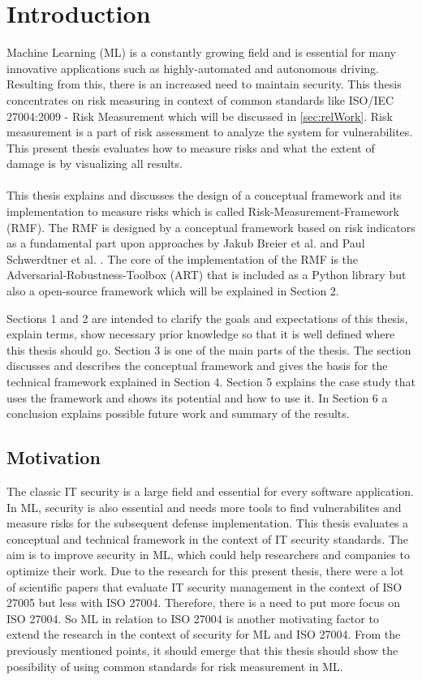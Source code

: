 \section{Introduction}
\label{sec:intro}

Machine Learning (ML) is a constantly growing field and is essential for many innovative applications such as highly-automated and autonomous driving. Resulting from this,
there is an increased need to maintain security. This thesis concentrates on risk measuring in context of common standards like ISO/IEC 27004:2009 - Risk Measurement which will be
discussed in \ref{sec:relWork}. Risk measurement is a part of risk assessment to analyze the system for vulnerabilites. This present thesis evaluates how to measure risks and what the
extent of damage is by visualizing all results. \\ \\
This thesis explains and discusses the design of a conceptual framework and its implementation to measure risks which is called Risk-Measurement-Framework (RMF). The RMF is designed by a
conceptual framework based on risk indicators as a fundamental part upon approaches by Jakub Breier et al. \cite{DBLP:journals/corr/abs-2012-04884} and Paul Schwerdtner et al.
\cite{DBLP:journals/corr/abs-2011-04328}. The core of the implementation of the RMF is the Adversarial-Robustness-Toolbox (ART) that is included as a Python library but also a open-source
framework which will be explained in Section 2.

Sections 1 and 2 are intended to clarify the goals and expectations of this thesis, explain terms, show necessary prior knowledge so that it is well defined where this thesis should go.
Section 3 is one of the main parts of the thesis. The section discusses and describes the conceptual framework and gives the basis for the technical framework explained in Section 4.
Section 5 explains the case study that uses the framework and shows its potential and how to use it. In Section 6 a conclusion explains possible future work and summary of the results.

\subsection{Motivation}

The classic IT security is a large field and essential for every software application. In ML, security is also essential and needs more tools to find vulnerabilites and measure risks for
the subsequent defense implementation. This thesis evaluates a conceptual and technical framework in the context of IT security standards. The aim is to improve security in ML, which could
help researchers and companies to optimize their work. Due to the research for this present thesis, there were a lot of scientific papers that evaluate IT security management in the
context of ISO 27005 but less with ISO 27004. Therefore, there is a need to put more focus on ISO 27004. So ML in relation to ISO 27004 is another motivating factor to extend the research
in the context of security for ML and ISO 27004. From the previously mentioned points, it should emerge that this thesis should show the possibility of using common standards for risk
measurement in ML.

